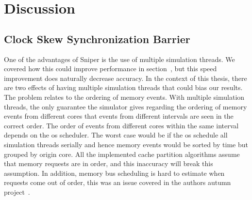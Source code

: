 
\chapter{Discussion}
\label{cpt:discussion}




\section{Clock Skew Synchronization Barrier}

One of the advantages of Sniper is the use of multiple simulation threads\cite{Carlson2011a}.
We covered how this could improve performance in section~, but this speed improvement does naturally decrease accuracy.
In the context of this thesis, there are two effects of having multiple
simulation threads that could bias our results.
The problem relates to the ordering of memory events.
With multiple simulation threads, the only guarantee the simulator gives regarding the ordering of memory events from different cores that events from different intervals are seen in the correct order.
The order of events from different cores within the same interval depends on the os scheduler.
The worst case would be if the os schedule all simulation threads serially and hence memory events would be sorted by time but grouped by origin core.
All the implemented cache partition algorithms assume that memory requests are in order, and this inaccuracy will break this assumption.
In addition, memory bus scheduling is hard to estimate when requests come out of order, this was an issue covered in the authors autumn project~\cite{Olsen2014}.

